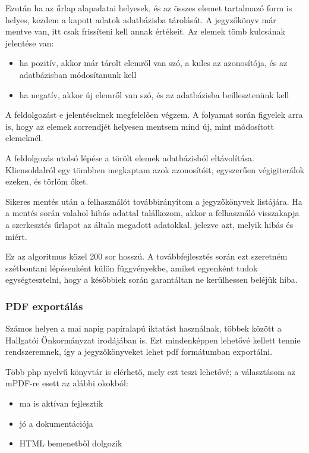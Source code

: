 \documentclass[a4paper,12pt,oneside]{report}
\begin{document}
Ezután ha az űrlap alapadatai helyesek, és az összes elemet tartalmazó form is helyes, kezdem a kapott adatok adatbázisba tárolását. A jegyzőkönyv már mentve van, itt csak frissíteni kell annak értékeit. Az elemek tömb kulcsának jelentése van:

\begin{itemize}
    \item ha pozitív, akkor már tárolt elemről van szó, a kulcs az azonosítója, és az adatbázisban módosítanunk kell
    \item ha negatív, akkor új elemről van szó, és az adatbázisba beillesztenünk kell
\end{itemize}

A feldolgozást e jelentéseknek megfelelően végzem. A folyamat során figyelek arra is, hogy az elemek sorrendjét helyesen mentsem mind új, mint módosított elemeknél.

A feldolgozás utolsó lépése a törölt elemek adatbázisból eltávolítása. Kliensoldalról egy tömbben megkaptam azok azonosítóit, egyszerűen végigiterálok ezeken, és törlöm őket.

Sikeres mentés után a felhasználót továbbirányítom a jegyzőkönyvek listájára. Ha a mentés során valahol hibás adattal találkozom, akkor a felhasználó visszakapja a szerkesztés űrlapot az általa megadott adatokkal, jelezve azt, melyik hibás és miért.

Ez az algoritmus közel 200 sor hosszú. A továbbfejlesztés során ezt szeretném szétbontani lépésenként külön függvényekbe, amiket egyenként tudok egységtesztelni, hogy a későbbiek során garantáltan ne kerülhessen beléjük hiba.

\subsubsection*{PDF exportálás}

Számos helyen a mai napig papíralapú iktatást használnak, többek között a Hallgatói Önkormányzat irodájában is. Ezt mindenképpen lehetővé kellett tennie rendszeremnek, így a jegyzőkönyveket lehet pdf formátumban exportálni.

Több php nyelvű könyvtár is elérhető, mely ezt teszi lehetővé; a választásom az mPDF-re esett az alábbi okokból:

\begin{itemize}
    \item ma is aktívan fejlesztik
    \item jó a dokumentációja
    \item HTML bemenetből dolgozik
\end{itemize}
\end{document}
